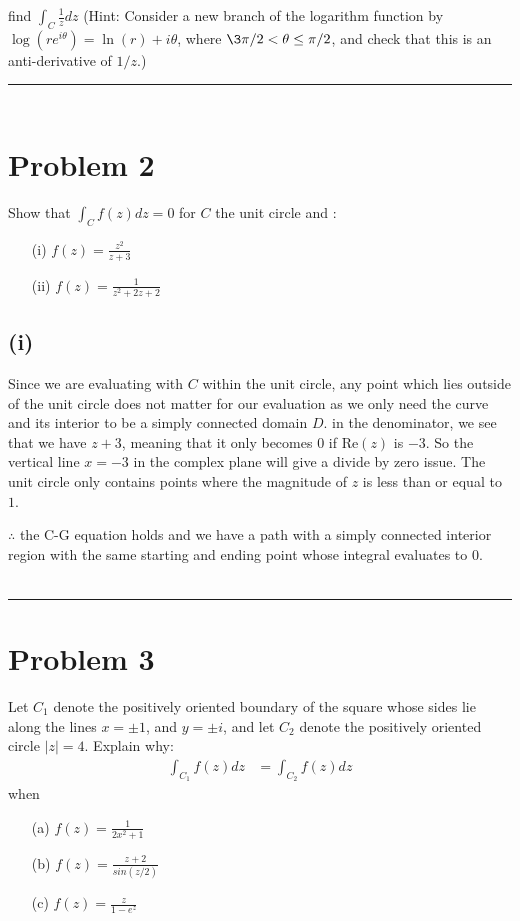 \documentclass{article}
\begin{document}

find $\int_C \frac{1}{z}dz$ (Hint: Consider a new branch of the logarithm function by $\log{(re^{i\theta})} = \ln{(r)} + i\theta$, where $\3\pi/2 < \theta \leq \pi/2$, and check that this is an anti-derivative of $1/z$.)
\vspace{1cm}
\hrule %

\begin{align*}
\end{align*}

\newpage
\section*{Problem 2}
Show that $\int_C f(z)dz = 0$ for $C$ the unit circle and :
\begin{enumerate}
  \item[(i)] $f(z) = \frac{z^2}{z+3}$
  \item[(ii)] $f(z) = \frac{1}{z^2 + 2z + 2}$
\end{enumerate}
\subsection*{(i)}
Since we are evaluating with $C$ within the unit circle, any point which lies outside of the unit circle does not matter for our evaluation as we only need the curve and its interior to be a simply connected domain $D$. in the denominator, we see that we have $z+3$, meaning that it only becomes 0 if Re$(z)$ is $-3$. So the vertical line $x = -3$ in the complex plane will give a divide by zero issue. The unit circle only contains points where the magnitude of $z$ is less than or equal to $1$.

$\therefore$ the C-G equation holds and we have a path with a simply connected interior region with the same starting and ending point whose integral evaluates to $0$. 

\begin{align*}
  
\end{align*}
\vspace{1cm} %

\hrule

\newpage
\section*{Problem 3}
Let $C_1$ denote the positively oriented boundary of the square whose sides lie along the lines $x = \pm 1$, and $y=\pm i$, and let $C_2$ denote the positively oriented circle $|z| = 4$. Explain why:
\begin{align*}
  \int_{C_1}f(z)dz &= \int_{C_2}f(z)dz
\end{align*}
when
\begin{enumerate}
  \item[(a)] $f(z) = \frac{1}{2x^2+1}$
  \item[(b)] $f(z) = \frac{z+2}{sin(z/2)}$
  \item[(c)] $f(z) = \frac{z}{1-e^z}$
\end{enumerate}
\end{document}
